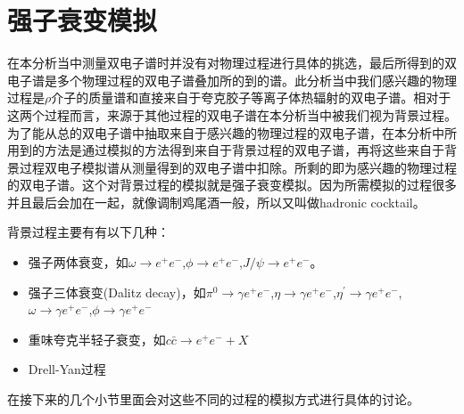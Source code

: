 \section{强子衰变模拟}
\label{ch:cocktail}
在本分析当中测量双电子谱时并没有对物理过程进行具体的挑选，最后所得到的双电子谱是多个物理过程的双电子谱叠加所的到的谱。此分析当中我们感兴趣的物理过程是$\rho$介子的质量谱和直接来自于夸克胶子等离子体热辐射的双电子谱。相对于这两个过程而言，来源于其他过程的双电子谱在本分析当中被我们视为背景过程。为了能从总的双电子谱中抽取来自于感兴趣的物理过程的双电子谱，在本分析中所用到的方法是通过模拟的方法得到来自于背景过程的双电子谱，再将这些来自于背景过程双电子模拟谱从测量得到的双电子谱中扣除。所剩的即为感兴趣的物理过程的双电子谱。这个对背景过程的模拟就是强子衰变模拟。因为所需模拟的过程很多并且最后会加在一起，就像调制鸡尾酒一般，所以又叫做hadronic cocktail。

背景过程主要有有以下几种：
\begin{itemize}
    \item 强子两体衰变，如$\omega \rightarrow e^+e^-$,$\phi \rightarrow e^+e^-$,$J/\psi \rightarrow e^+e^-$。
    \item 强子三体衰变(Dalitz decay)，如$\pi^0 \rightarrow \gamma e^+e^-$,$\eta \rightarrow \gamma e^+e^-$,$\eta^\prime \rightarrow \gamma e^+e^-$,$\omega \rightarrow \gamma e^+e^-$,$\phi \rightarrow \gamma e^+e^-$
    \item 重味夸克半轻子衰变，如$c\bar{c} \rightarrow e^+e^-+X$
    \item Drell-Yan过程
\end{itemize}
在接下来的几个小节里面会对这些不同的过程的模拟方式进行具体的讨论。




